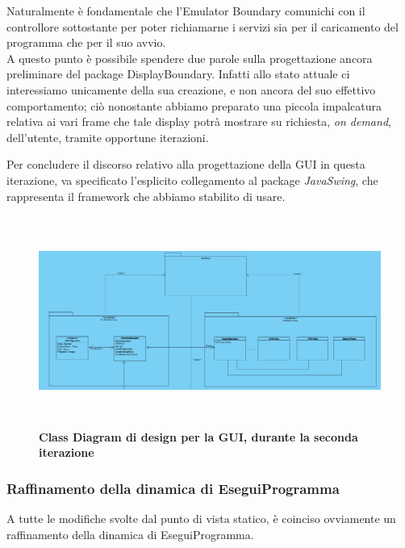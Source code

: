 \documentclass[11pt]{article}
\begin{document}
Naturalmente è fondamentale che l'Emulator Boundary comunichi con il controllore sottostante per poter richiamarne i servizi sia per il caricamento del programma che per il suo avvio.\\
A questo punto è possibile spendere due parole sulla progettazione ancora preliminare del package DisplayBoundary. Infatti allo stato attuale ci interessiamo unicamente della sua creazione, e non ancora del suo effettivo comportamento; ciò nonostante abbiamo preparato una piccola impalcatura relativa ai vari frame che tale display potrà mostrare su richiesta, \emph{on demand}, dell'utente, tramite opportune iterazioni.

Per concludere il discorso relativo alla progettazione della GUI in questa iterazione, va specificato l'esplicito collegamento al package \emph{JavaSwing}, che rappresenta il framework che abbiamo stabilito di usare.\\

\begin{figure}[!h]
\hspace*{-4.3cm}
\centering
\includegraphics[width=600px, height=260px]{CD_UI.png}
\small\textbf{Class Diagram di design per la GUI, durante la seconda iterazione}\\
\end{figure}


\clearpage
\subsubsection{Raffinamento della dinamica di EseguiProgramma}
A tutte le modifiche svolte dal punto di vista statico, è coinciso ovviamente un raffinamento della dinamica di EseguiProgramma.
\end{document}
